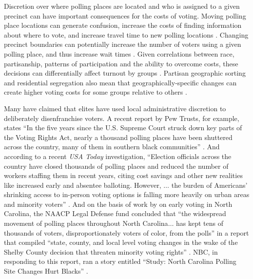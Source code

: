 \documentclass[12pt]{article}
\begin{document}
Discretion over where polling places are located and who is assigned to a given precinct can have important consequences for the costs of voting.  Moving polling place locations can generate confusion, increase the costs of finding information about where to vote, and increase travel time to new polling locations \citep{brady2011turning}. Changing precinct boundaries can potentially increase the number of voters using a given polling place, and thus increase wait times \citep{nytimesprecinctchanges}.  Given correlations between race, partisanship, patterns of participation and the ability to overcome costs, these decisions can differentially affect turnout by groups \citep{verba1995voice,leighley2013votes}.  Partisan geographic sorting and residential segregation also mean that geographically-specific changes can create higher voting costs for some groups relative to others \citep{Nall:2015gu,Rothstein:2017vc}.

Many have claimed that elites have used local administrative discretion to deliberately disenfranchise voters. A recent report by Pew Trusts, for example, states ``In the five years since the U.S. Supreme Court struck down key parts of the Voting Rights Act, nearly a thousand polling places have been shuttered across the country, many of them in southern black communities'' \cite{Vasilogambros:2018wu}. And according to a recent \emph{USA Today} investigation, ``Election officials across the country have closed thousands of polling places and reduced the number of workers staffing them in recent years, citing cost savings and other new realities like increased early and absentee balloting. However, $\ldots$ the burden of Americans' shrinking access to in-person voting options is falling more heavily on urban areas and minority voters'' \cite{USAToday:2018tr}. And on the basis of work by \cite{insightus2016} on early voting in North Carolina, the NAACP Legal Defense fund concluded that ``the widespread movement of polling places throughout North Carolina$\ldots$ has kept tens of thousands of voters, disproportionately voters of color, from the polls'' in a report that compiled ``state, county, and local level voting changes in the wake of the Shelby County decision that threaten minority voting rights'' \citep{NAACPLegalDefenseFund2016}. NBC, in responding to this report, ran a story entitled ``Study: North Carolina Polling Site Changes Hurt Blacks'' \citep{roth2015x}.
\end{document}
